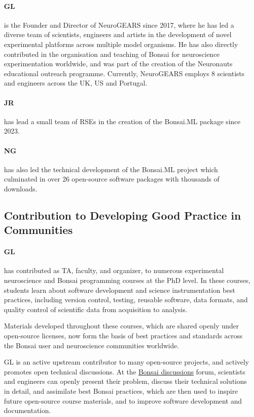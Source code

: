 \paragraph{GL} is the Founder and Director of NeuroGEARS since 2017, where he has led a diverse team of scientists, engineers and artists in the development of novel experimental platforms across multiple model organisms. He has also directly contributed in the organisation and teaching of Bonsai for neuroscience experimentation worldwide, and was part of the creation of the Neuronauts educational outreach programme. Currently, NeuroGEARS employs 8 scientists and engineers across the UK, US and Portugal.

\paragraph{JR} has lead a small team of RSEs in the
creation of the Bonsai.ML package since 2023.

\paragraph{NG} has also led the technical development of the Bonsai.ML project which culminated in over 26 open-source software packages with thousands of downloads.

\subsection{Contribution to Developing Good Practice in Communities}

\paragraph{GL} has contributed as TA, faculty, and organizer, to numerous experimental neuroscience and Bonsai programming courses at the PhD level. In these courses, students learn about software development and science instrumentation best practices, including version control, testing, reusable software, data formats, and quality control of scientific data from acquisition to analysis.

Materials developed throughout these courses, which are shared openly under open-source licenses, now form the basis of best practices and standards across the Bonsai user and neuroscience communities worldwide.

GL is an active upstream contributor to many open-source projects, and actively promotes open technical discussions. At the \href{https://github.com/orgs/bonsai-rx/discussions}{Bonsai discussions} forum, scientists and engineers can openly present their problem, discuss their technical solutions in detail, and assimilate best
Bonsai practices, which are then used to inspire future open-source course materials, and to improve software development and documentation.

